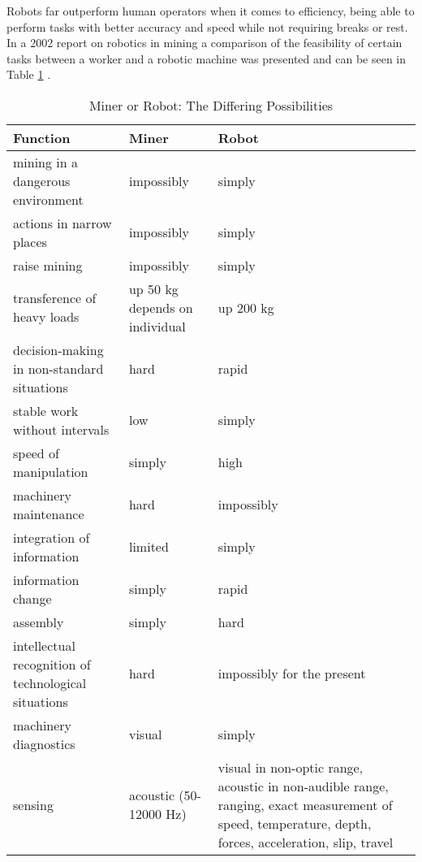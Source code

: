 Robots far outperform human operators when it comes to efficiency, being able to perform tasks with better accuracy and speed while not requiring breaks or rest. In a 2002 report on robotics in mining a comparison of the feasibility of certain tasks between a worker and a robotic machine was presented and can be seen in Table \ref{tab:table} \cite{table}.\\
\begin{adjustbox}{max width=\textwidth}
\begin{center}
\begin{table}[ht!]
\caption[]{Miner or Robot: The Differing Possibilities \cite{table}}
\small
\hfill{}
\resizebox{6.5in}{!} {
\begin{tabular}{p{3in} p{2.5in} p{2in} p{3in}}
\toprule
Function & Miner & Robot\\
\midrule
mining in a dangerous environment & impossibly & simply\\
actions in narrow places & impossibly & simply\\
raise mining & impossibly & simply\\
transference of heavy loads & up 50 kg depends on individual & up 200 kg\\
decision-making in non-standard situations & hard & rapid\\
stable work without intervals & low & simply\\
speed of manipulation & simply & high\\
machinery maintenance & hard & impossibly\\
integration of information & limited & simply\\
information change & simply & rapid\\
assembly & simply & hard\\
intellectual recognition of technological situations & hard & impossibly for the present\\
machinery diagnostics & visual & simply\\
sensing & acoustic (50-12000 Hz) & visual in non-optic range, acoustic in non-audible range, ranging, exact measurement of speed, temperature, depth, forces, acceleration, slip, travel\\
\bottomrule
\end{tabular}
}
\hfill{}
\label{tab:table}
\end{table}
\end{center}
\end{adjustbox}
